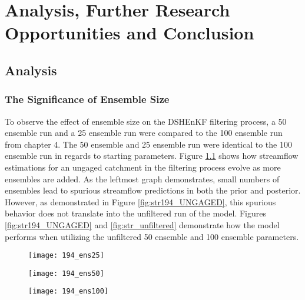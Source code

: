 \chapter{Analysis, Further Research Opportunities and Conclusion}

\section{Analysis}

\subsection{The Significance of Ensemble Size}

To observe the effect of ensemble size on the DSHEnKF filtering process, a 50 ensemble run and a 25 ensemble run were compared to the 100 ensemble run from chapter 4. The 50 ensemble and 25 ensemble run were identical to the 100 ensemble run in regards to starting parameters. Figure \ref{fig:194_ens} shows how streamflow estimations for an ungaged catchment in the filtering process evolve as more ensembles are added. As the leftmost graph demonstrates, small numbers of ensembles lead to spurious streamflow predictions in both the prior and posterior. However, as demonstrated in Figure \ref{fig:str194_UNGAGED}, this spurious behavior does not translate into the unfiltered run of the model. Figures \ref{fig:str194_UNGAGED} and \ref{fig:str_unfiltered} demonstrate how the model performs when utilizing the unfiltered 50 ensemble and 100 ensemble parameters.

\begin{figure}
\centering
\begin{minipage}{.33\textwidth}
  \centering
  \texttt{[image: 194\_ens25]}
  \label{fig:194_ens25}
\end{minipage}%
\begin{minipage}{.33\textwidth}
  \centering
  \texttt{[image: 194\_ens50]}
  \label{fig:194_ens50}
\end{minipage}
\begin{minipage}{.33\textwidth}
  \centering
  \texttt{[image: 194\_ens100]}
  \label{fig:194_ens100}
\end{minipage}
\label{fig:194_ens}
\end{figure}

